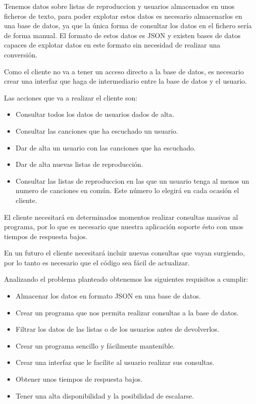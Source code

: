 \documentclass[12pt]{report} %
\begin{document}
Tenemos datos sobre listas de reproduccion y usuarios almacenados en unos ficheros de texto, para poder explotar estos datos es necesario almacenarlos en una base de datos, ya que la única forma de consultar los datos en el fichero sería de forma manual. El formato de estos datos es JSON y existen bases de datos capaces de explotar datos en este formato sin necesidad de realizar una conversión.

Como el cliente no va a tener un acceso directo a la base de datos, es necesario crear una interfaz que haga de intermediario entre la base de datos y el usuario.

Las acciones que va a realizar el cliente son:
\begin{itemize}
	\item Consultar todos los datos de usuarios dados de alta.
	\item Consultar las canciones que ha escuchado un usuario.
	\item Dar de alta un usuario con las canciones que ha escuchado.
	\item Dar de alta nuevas listas de reproducción.
	\item Consultar las listas de reproduccion en las que un usuario tenga al menos un numero de canciones en común. Este número lo elegirá en cada ocasión el cliente.
\end{itemize}

El cliente necesitará en determinados momentos realizar consultas masivas al programa, por lo que es necesario que nuestra aplicación soporte ésto con unos tiempos de respuesta bajos. 

En un futuro el cliente necesitará incluir nuevas consultas que vayan surgiendo, por lo tanto es necesario que el código sea fácil de actualizar.

Analizando el problema planteado obtenemos los siguientes requisitos a cumplir:
\begin{itemize}
	\item Almacenar los datos en formato JSON en una base de datos.
	\item Crear un programa que nos permita realizar consultas a la base de datos.
	\item Filtrar los datos de las listas o de los usuarios antes de devolverlos.
	\item Crear un programa sencillo y fácilmente mantenible.
	\item Crear una interfaz que le facilite al usuario realizar sus consultas.
	\item Obtener unos tiempos de respuesta bajos.
	\item Tener una alta disponibilidad y la posibilidad de escalarse.
\end{itemize}
\end{document}
